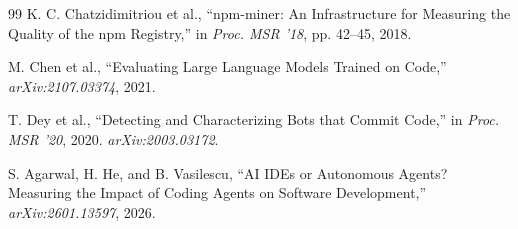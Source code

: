 \documentclass[11pt,a4paper]{article}
\begin{document}
\begin{thebibliography}{99}
K. C. Chatzidimitriou et al.,
``npm-miner: An Infrastructure for Measuring the Quality of the npm Registry,''
in \textit{Proc. MSR '18}, pp. 42--45, 2018.

M. Chen et al.,
``Evaluating Large Language Models Trained on Code,''
\textit{arXiv:2107.03374}, 2021.

T. Dey et al.,
``Detecting and Characterizing Bots that Commit Code,''
in \textit{Proc. MSR '20}, 2020. \textit{arXiv:2003.03172}.

S. Agarwal, H. He, and B. Vasilescu,
``AI IDEs or Autonomous Agents? Measuring the Impact of Coding Agents on Software Development,''
\textit{arXiv:2601.13597}, 2026.

\end{thebibliography}
\end{document}
